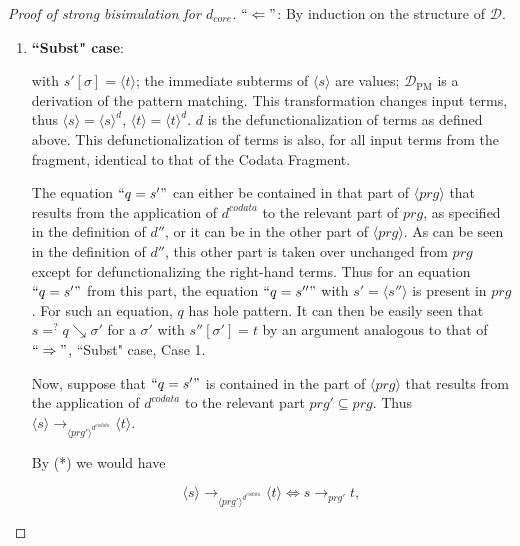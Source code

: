 \begin{proof}[Proof of strong bisimulation for $d_{core}$]
$`` \Leftarrow "$: By induction on the structure of $\mathcal{D}$.

\begin{enumerate}
\item \textbf{``Subst" case}:

\begin{prooftree}
\end{prooftree}

with $s'[\sigma] = \langle t \rangle$; the immediate subterms of $\langle s \rangle$ are values; $\mathcal{D}_{\textrm{PM}}$ is a derivation of the pattern matching. This transformation changes input terms, thus $\langle s \rangle = \langle s \rangle^d$, $\langle t \rangle = \langle t \rangle^d$. $d$ is the defunctionalization of terms as defined above. This defunctionalization of terms is also, for all input terms from the fragment, identical to that of the Codata Fragment.

The equation $`` q = s' "$ can either be contained in that part of $\langle prg \rangle$ that results from the application of $d^{codata}$ to the relevant part of $prg$, as specified in the definition of $d''$, or it can be in the other part of $\langle prg \rangle$. As can be seen in the definition of $d''$, this other part is taken over unchanged from $prg$ except for defunctionalizing the right-hand terms. Thus for an equation $`` q = s' "$ from this part, the equation $`` q = s'' "$ with $s' = \langle s'' \rangle$ is present in $prg$. For such an equation, $q$ has hole pattern. It can then be easily seen that $s =^? q \searrow \sigma'$ for a $\sigma'$ with $s''[\sigma'] = t$ by an argument analogous to that of $`` \Rightarrow "$, ``Subst" case, Case 1.

Now, suppose that $`` q = s' "$ is contained in the part of $\langle prg \rangle$ that results from the application of $d^{codata}$ to the relevant part $prg' \subseteq prg$. Thus $\langle s \rangle \longrightarrow_{\langle prg' \rangle^{d^{codata}}} \langle t \rangle$.

By (*) we would have

\begin{equation*}
\langle s \rangle \longrightarrow_{\langle prg' \rangle^{d^{codata}}} \langle t \rangle \iff s \longrightarrow_{prg'} t,
\end{equation*}


\end{enumerate}
\end{proof}
